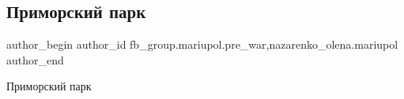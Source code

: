  
 
 
 
 

\subsection{Приморский парк}
\label{sec:25_02_2023.fb.fb_group.mariupol.pre_war.2.primorskii_park}
 
\ifcmt
 author_begin
   author_id fb_group.mariupol.pre_war,nazarenko_olena.mariupol
 author_end
\fi

Приморский парк
